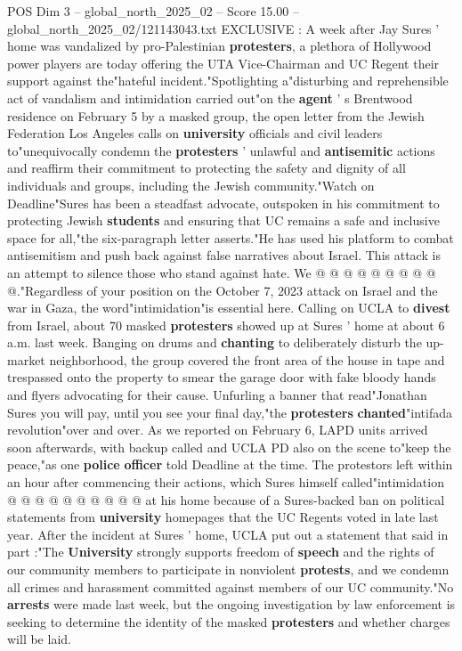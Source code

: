 \begin{textsample}{POS Dim 3 – global\_north\_2025\_02 – Score 15.00 – global\_north\_2025\_02/121143043.txt}  \label{ex:f3_pos_287}
EXCLUSIVE : A week after Jay Sures ' home was vandalized by pro-Palestinian \textbf{protesters}, a plethora of Hollywood power players are today offering the UTA Vice-Chairman and UC Regent their support against the"hateful incident."Spotlighting a"disturbing and reprehensible act of vandalism and intimidation carried out"on the \textbf{agent} ' s Brentwood residence on February 5 by a masked group, the open letter from the Jewish Federation Los Angeles calls on \textbf{university} officials and civil leaders to"unequivocally condemn the \textbf{protesters} ' unlawful and \textbf{antisemitic} actions and reaffirm their commitment to protecting the safety and dignity of all individuals and groups, including the Jewish community."Watch on Deadline"Sures has been a steadfast advocate, outspoken in his commitment to protecting Jewish \textbf{students} and ensuring that UC remains a safe and inclusive space for all,"the six-paragraph letter asserts."He has used his platform to combat antisemitism and push back against false narratives about Israel.
This attack is an attempt to silence those who stand against hate.
We @ @ @ @ @ @ @ @ @ @."Regardless of your position on the October 7, 2023 attack on Israel and the war in Gaza, the word"intimidation"is essential here.
Calling on UCLA to \textbf{divest} from Israel, about 70 masked \textbf{protesters} showed up at Sures ' home at about 6 a.m. last week.
Banging on drums and \textbf{chanting} to deliberately disturb the up-market neighborhood, the group covered the front area of the house in tape and trespassed onto the property to smear the garage door with fake bloody hands and flyers advocating for their cause.
Unfurling a banner that read"Jonathan Sures you will pay, until you see your final day,"the \textbf{protesters} \textbf{chanted}"intifada revolution"over and over.
As we reported on February 6, LAPD units arrived soon afterwards, with backup called and UCLA PD also on the scene to"keep the peace,"as one \textbf{police} \textbf{officer} told Deadline at the time.
The protestors left within an hour after commencing their actions, which Sures himself called"intimidation @ @ @ @ @ @ @ @ @ @ at his home because of a Sures-backed ban on political statements from \textbf{university} homepages that the UC Regents voted in late last year.
After the incident at Sures ' home, UCLA put out a statement that said in part :"The \textbf{University} strongly supports freedom of \textbf{speech} and the rights of our community members to participate in nonviolent \textbf{protests}, and we condemn all crimes and harassment committed against members of our UC community."No \textbf{arrests} were made last week, but the ongoing investigation by law enforcement is seeking to determine the identity of the masked \textbf{protesters} and whether charges will be laid.

\end{textsample}
